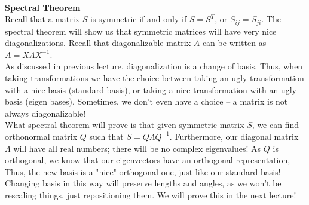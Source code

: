 \documentclass[12pt]{amsart}
\begin{document}
\\
\textbf{Spectral Theorem}\\
Recall that a matrix $S$ is symmetric if and only if $S = S^T$, or $S_{ij} = S_{ji}$. The spectral theorem will show us that symmetric matrices will have very nice diagonalizations. Recall that diagonalizable matrix $A$ can be written as $A = X \Lambda X^{-1}$.\\
As discussed in previous lecture, diagonalization is a change of basis. Thus, when taking transformations we have the choice between taking an ugly transformation with a nice basis (standard basis), or taking a nice transformation with an ugly basis (eigen bases). Sometimes, we don't even have a choice -- a matrix is not always diagonalizable!\\
What spectral theorem will prove is that given symmetric matrix $S$, we can find orthonormal matrix $Q$ such that $S = Q \Lambda Q^{-1}$. Furthermore, our diagonal matrix $\Lambda$ will have all real numbers; there will be no complex eigenvalues! As $Q$ is orthogonal, we know that our eigenvectors have an orthogonal representation, Thus, the new basis is a "nice" orthogonal one, just like our standard basis! Changing basis in this way will preserve lengths and angles, as we won't be rescaling things, just repositioning them. We will prove this in the next lecture!
\end{document}
